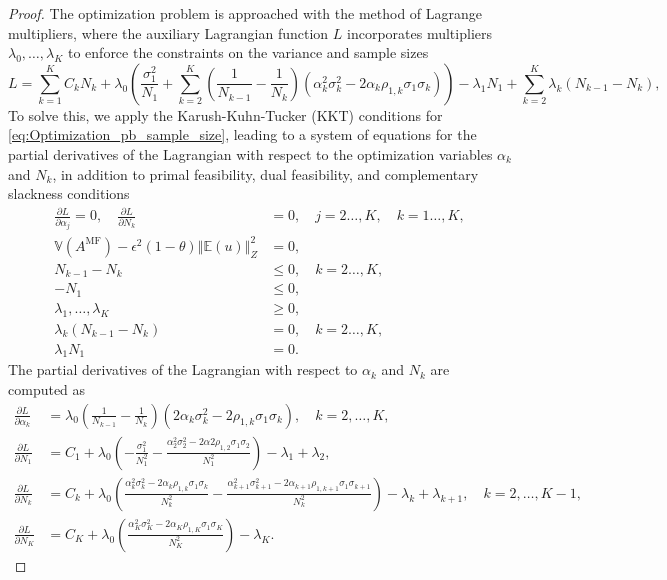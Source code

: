 \begin{proof}
The optimization problem is approached with the method of Lagrange multipliers, where the auxiliary Lagrangian function $L$ incorporates multipliers $\lambda_0,\ldots, \lambda_K$ to enforce the constraints on the variance and sample sizes
%
\[
L = \sum_{k=1}^K C_kN_k +\lambda_0 \left(\frac{\sigma_1^2}{N_1} + \sum_{k=2}^K \left(\frac{1}{N_{k-1}} - \frac{1}{N_k}\right)\left(\alpha_k^2\sigma_k^2 - 2\alpha_k\rho_{1,k}\sigma_1\sigma_k\right)\right)-\lambda_1 N_1+\sum_{k=2}^K\lambda_k(N_{k-1} - N_k),
\]
%
To solve this, we apply the Karush-Kuhn-Tucker (KKT) conditions for \eqref{eq:Optimization_pb_sample_size}, leading to a system of equations for the partial derivatives of the Lagrangian with respect to the optimization variables $\alpha_k$ and $N_k$,  in addition to  primal feasibility, dual feasibility, and complementary slackness conditions
%
\begin{align*}
\frac{\partial L}{\partial \alpha_j}=0,\quad \frac{\partial L}{\partial N_k}&=0,\quad j=2\ldots,K, \quad k=1\ldots,K,\\
\mathbb{V}\left(A^{\text{MF}}\right)- \epsilon^2(1-\theta)\left\Vert\mathbb{E}(u) \right\Vert_{Z}^2 &= 0,\\
    N_{k-1}-N_k&\le 0, \quad k=2\ldots,K,\\
    -N_1&\le 0,\\[6pt]
    \lambda_1,\ldots,\lambda_K &\ge 0,\\
    \lambda_k(N_{k-1}-N_k)&=0,\quad k=2\ldots,K,\\
    \lambda_1 N_1&=0.
\end{align*}
%
The partial derivatives of the Lagrangian with respect to $\alpha_k$ and $N_k$ are computed as
%
\begin{align*}
    \frac{\partial L}{\partial \alpha_k}&=\lambda_0\left(\frac{1}{N_{k-1}} - \frac{1}{N_k}\right)\left(2\alpha_k\sigma_k^2 - 2\rho_{1,k}\sigma_1\sigma_k\right),\quad k=2,\dots,K,\\
    \frac{\partial L}{\partial N_1}&=C_1 + \lambda_0\left(-\frac{\sigma_1^2}{N_1^2} - \frac{\alpha_2^2\sigma_2^2-2\alpha2\rho_{1,2}\sigma_1\sigma_2}{N_1^2}\right)-\lambda_1+\lambda_2,\\
    \frac{\partial L}{\partial N_k}&=C_k+\lambda_0\left(\frac{\alpha_k^2\sigma_k^2 - 2\alpha_k\rho_{1,k}\sigma_1\sigma_k}{N_k^2}-\frac{\alpha_{k+1}^2\sigma_{k+1}^2 - 2\alpha_{k+1}\rho_{1,k+1}\sigma_1\sigma_{k+1}}{N_k^2}\right)-\lambda_k+\lambda_{k+1}, \quad k=2,\dots,K-1,\\
    \frac{\partial L}{\partial N_K}&=C_K + \lambda_0\left(\frac{\alpha_K^2\sigma_K^2 - 2\alpha_K\rho_{1,K}\sigma_1\sigma_K}{N_K^2}\right)-\lambda_K.

\end{align*}
\end{proof}
